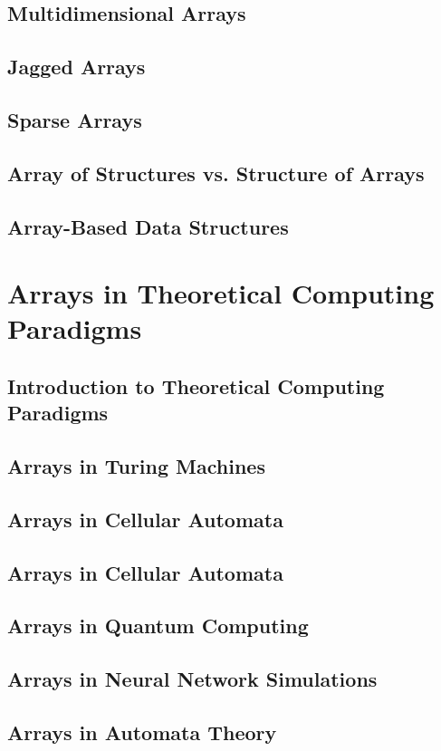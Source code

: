 \documentclass[12pt, oneside]{book}
\begin{document}
	\section{Multidimensional Arrays}
	\section{Jagged Arrays}
	\section{Sparse Arrays}
	\section{Array of Structures vs. Structure of Arrays}
	\section{Array-Based Data Structures}

\chapter{Arrays in Theoretical Computing Paradigms}

\section{Introduction to Theoretical Computing Paradigms}
\section{Arrays in Turing Machines}
\section{Arrays in Cellular Automata}
\section{Arrays in Cellular Automata}
\section{Arrays in Quantum Computing}
\section{Arrays in Neural Network Simulations}
\section{Arrays in Automata Theory}
\end{document}
